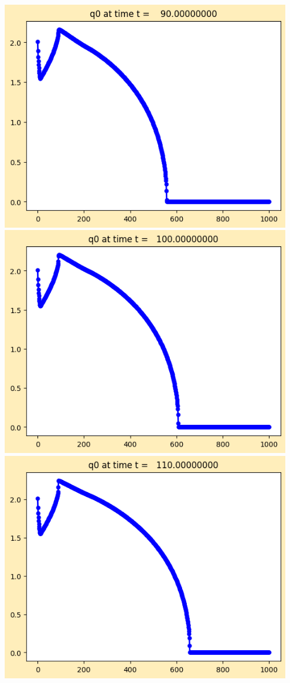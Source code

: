 \documentclass[11pt]{article}
\begin{document}
\vskip 10pt 
\includegraphics[width=0.95\textwidth]{frame0009fig1.png}
\vskip 10pt 
\includegraphics[width=0.95\textwidth]{frame0010fig1.png}
\vskip 10pt 
\includegraphics[width=0.95\textwidth]{frame0011fig1.png}
\end{document}
